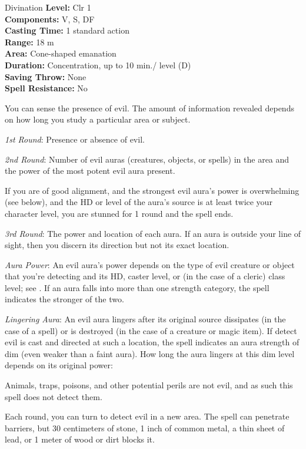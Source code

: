 {Divination}
{
	\textbf{Level:}
	Clr 1\\
	\textbf{Components:}
	V, S, DF\\
	\textbf{Casting Time:}
	1 standard action\\
	\textbf{Range:}
	18 m\\
	\textbf{Area:}
	Cone-shaped emanation\\
	\textbf{Duration:}
	Concentration, up to 10 min./ level (D)\\
	\textbf{Saving Throw:}
	None\\
	\textbf{Spell Resistance:}
	No\\
}
{
	You can sense the presence of evil. The amount of information revealed depends on how long you study a particular area or subject.

	\textit{1st Round}:
	Presence or absence of evil.

	\textit{2nd Round}:
	Number of evil auras (creatures, objects, or spells) in the area and the power of the most potent evil aura present.

	If you are of good alignment, and the strongest evil aura's power is overwhelming (see below), and the HD or level of the aura's source is at least twice your character level, you are stunned for 1 round and the spell ends.

	\textit{3rd Round}:
	The power and location of each aura. If an aura is outside your line of sight, then you discern its direction but not its exact location.

	\textit{Aura Power}:
	An evil aura's power depends on the type of evil creature or object that you're detecting and its HD, caster level, or (in the case of a cleric) class level; see . If an aura falls into more than one strength category, the spell indicates the stronger of the two.

	\textit{Lingering Aura}:
	An evil aura lingers after its original source dissipates (in the case of a spell) or is destroyed (in the case of a creature or magic item). If detect evil is cast and directed at such a location, the spell indicates an aura strength of dim (even weaker than a faint aura). How long the aura lingers at this dim level depends on its original power:


	Animals, traps, poisons, and other potential perils are not evil, and as such this spell does not detect them.

	Each round, you can turn to detect evil in a new area. The spell can penetrate barriers, but 30 centimeters of stone, 1 inch of common metal, a thin sheet of lead, or 1 meter of wood or dirt blocks it.

}
